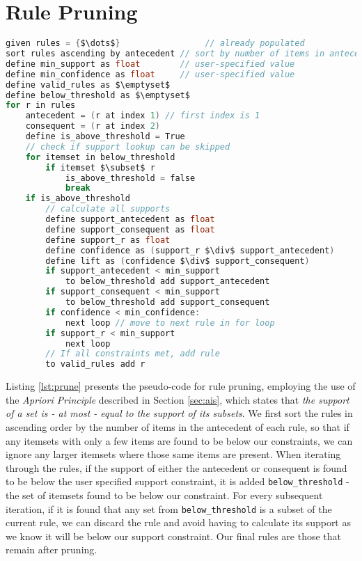 \section{Rule Pruning}
\label{sec:prune}
\begin{lstlisting}[language=C, mathescape=true, caption=Rule Pruning, label=lst:prune]
given rules = {$\dots$}                 // already populated
sort rules ascending by antecedent // sort by number of items in antecedent
define min_support as float        // user-specified value
define min_confidence as float     // user-specified value
define valid_rules as $\emptyset$
define below_threshold as $\emptyset$
for r in rules
    antecedent = (r at index 1) // first index is 1
    consequent = (r at index 2)
    define is_above_threshold = True 
    // check if support lookup can be skipped
    for itemset in below_threshold
        if itemset $\subset$ r
            is_above_threshold = false
            break
    if is_above_threshold
        // calculate all supports
        define support_antecedent as float
        define support_consequent as float
        define support_r as float 
        define confidence as (support_r $\div$ support_antecedent)
        define lift as (confidence $\div$ support_consequent)
        if support_antecedent < min_support
            to below_threshold add support_antecedent
        if support_consequent < min_support
            to below_threshold add support_consequent
        if confidence < min_confidence:
            next loop // move to next rule in for loop
        if support_r < min_support
            next loop 
        // If all constraints met, add rule
        to valid_rules add r
\end{lstlisting}
Listing \ref{lst:prune} presents the pseudo-code for rule pruning, employing the use of the \textit{Apriori Principle} described in Section \ref{sec:ais}, which states that \textit{the support of a set is - at most - equal to the support of its subsets}.
We first sort the rules in ascending order by the number of items in the antecedent of each rule, so that if any itemsets with only a few items are found to be below our constraints, we can ignore any larger itemsets where those same items are present.
When iterating through the rules, if the support of either the antecedent or consequent is found to be below the user specified support constraint, it is added \texttt{below\_threshold} - the set of itemsets found to be below our constraint. For every subsequent iteration, if it is found that any set from \texttt{below\_threshold} is a subset of the current rule, we can discard the rule and avoid having to calculate its support as we know it will be below our support constraint. Our final rules are those that remain after pruning.

